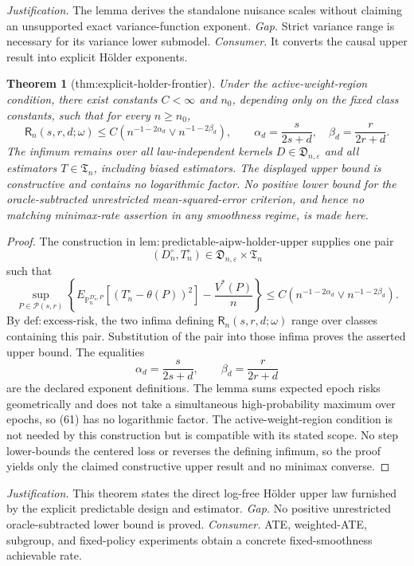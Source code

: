 \documentclass{article}
\newtheorem{theorem}{Theorem}
\begin{document}
\par\smallskip\noindent \textit{Justification.} The lemma derives the standalone nuisance scales without claiming an unsupported exact variance-function exponent. \textit{Gap.} Strict variance range is necessary for its variance lower submodel. \textit{Consumer.} It converts the causal upper result into explicit Hölder exponents.

\begin{theorem}[thm:explicit-holder-frontier]\label{thm:explicit-holder-frontier}
Under the active-weight-region condition, there exist constants \(C<\infty\) and \(n_0\), depending only on the fixed class constants, such that for every \(n\geq n_0\),
\[
\mathsf R_n(s,r,d;\omega)
\leq C\left(n^{-1-2\alpha_d}\vee n^{-1-2\beta_d}\right),
\qquad
\alpha_d=\frac{s}{2s+d},\quad
\beta_d=\frac{r}{2r+d}.
\]
The infimum remains over all law-independent kernels \(D\in\mathfrak D_{n,\varepsilon}\) and all estimators \(T\in\mathfrak T_n\), including biased estimators.  The displayed upper bound is constructive and contains no logarithmic factor.  No positive lower bound for the oracle-subtracted unrestricted mean-squared-error criterion, and hence no matching minimax-rate assertion in any smoothness regime, is made here.
\end{theorem}
\begin{proof}
The construction in \(\mathrm{lem{:}predictable\text{-}aipw\text{-}holder\text{-}upper}\) supplies one pair
\[
(D_n^{\circ},T_n^{\circ})\in
\mathfrak D_{n,\varepsilon}\times\mathfrak T_n
\]
such that
\[
\sup_{P\in\mathcal P(s,r)}
\left\{
E_{\mathbb P_n^{D_n^{\circ},P}}
[(T_n^{\circ}-\theta(P))^2]-\frac{V^*(P)}n
\right\}
\leq C\left(n^{-1-2\alpha_d}\vee n^{-1-2\beta_d}\right).
\tag{61}
\]
By \(\mathrm{def{:}excess\text{-}risk}\), the two infima defining \(\mathsf R_n(s,r,d;\omega)\) range over classes containing this pair. Substitution of the pair into those infima proves the asserted upper bound. The equalities
\[
\alpha_d=\frac{s}{2s+d},\qquad
\beta_d=\frac{r}{2r+d}
\]
are the declared exponent definitions. The lemma sums expected epoch risks geometrically and does not take a simultaneous high-probability maximum over epochs, so (61) has no logarithmic factor. The active-weight-region condition is not needed by this construction but is compatible with its stated scope. No step lower-bounds the centered loss or reverses the defining infimum, so the proof yields only the claimed constructive upper result and no minimax converse.
\end{proof}
\par\smallskip\noindent \textit{Justification.} This theorem states the direct log-free Hölder upper law furnished by the explicit predictable design and estimator. \textit{Gap.} No positive unrestricted oracle-subtracted lower bound is proved. \textit{Consumer.} ATE, weighted-ATE, subgroup, and fixed-policy experiments obtain a concrete fixed-smoothness achievable rate.
\end{document}
